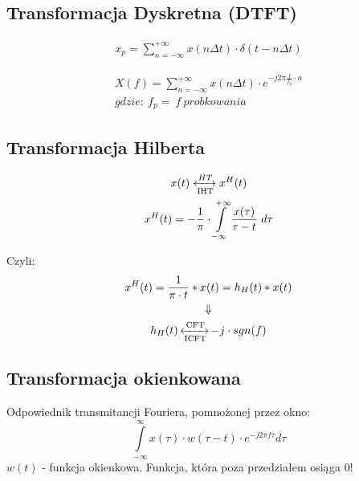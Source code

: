     \subsection{Transformacja Dyskretna (DTFT)}
         \begin{multicols}{2}
            \begin{gather*}
                x_p = \sum\limits_{n=-\infty}^{+\infty}x(n\Delta t)\cdot \delta(t-n\Delta t)
            \end{gather*}

            \begin{gather*}
                X(f) = \sum\limits_{n = -\infty}^{+\infty}x(n\Delta t) \cdot e^{-j2 \pi \frac{f}{f_{p}}\cdot n}\\
                gdzie:\ f_p =\ f\ probkowania
            \end{gather*}
         \end{multicols}

    \newpage
    \subsection{Transformacja Hilberta}
        \begin{multicols}{2}
            \begin{gather*}
                x(t) \xleftrightarrow[\text{IHT}]{HT} x^H(t)\\
                x^H(t) = -\frac{1}{\pi}  \cdot \int\limits_{-\infty}^{+\infty}\frac{x(\tau)}{\tau-t}\ d\tau
            \end{gather*}

            \noindent Czyli:
            \begin{gather*}
                x^H(t) = \frac{1}{\pi\cdot t}*x(t) = h_H(t)*x(t)\\
                \Downarrow\\
                h_H(t) \operatorname{\xleftrightarrow[\text{ICFT}]{\text{CFT}}} -j \cdot sgn(f)
            \end{gather*}
        \end{multicols}

    \subsection{Transformacja okienkowana}
        \tab Odpowiednik transmitancji Fouriera, pomnożonej przez okno:
        \begin{equation*}
            \int \limits_{-\infty}^{\infty} x(\tau) \cdot  w(\tau-t) \cdot e^{-j2\pi f \tau}d\tau
        \end{equation*}
        $w(t)$ - funkcja okienkowa. Funkcja, która poza przedziałem osiąga 0!
